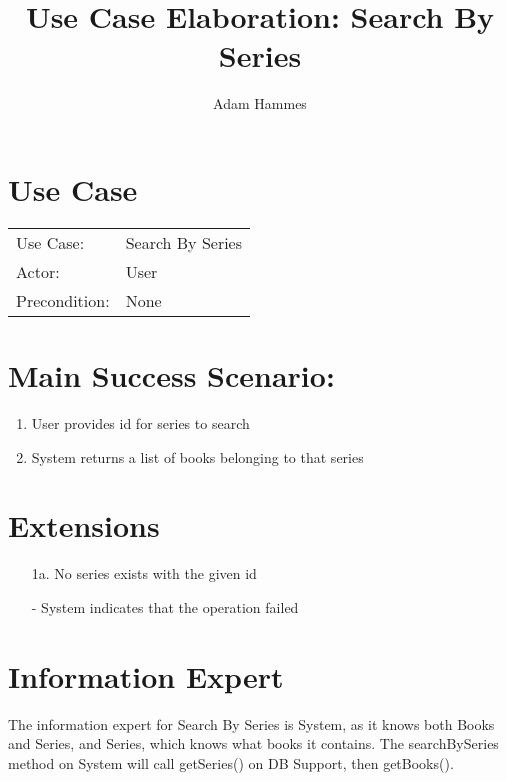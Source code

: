 \documentclass{article}
\title{Use Case Elaboration: Search By Series}
\author{ Adam Hammes }
\begin{document}
\maketitle


\section*{Use Case}
\begin{tabular}{l l}
Use Case:     & Search By Series\\
Actor:        & User \\
Precondition: & None \\
\end{tabular}


\section*{Main Success Scenario:}

\begin{enumerate}
   \item User provides id for series to search
   \item System returns a list of books belonging to that series

\end{enumerate}

\section*{Extensions}

\begin{itemize}
    \item [1a.] No series exists with the given id

    - System indicates that the operation failed
                            
\end{itemize}


\section*{Information Expert}

The information expert for Search By Series is System, as it knows both Books
and Series, and Series, which knows what books it contains.
The searchBySeries method on System will call getSeries() on DB Support, then getBooks().
\end{document}
